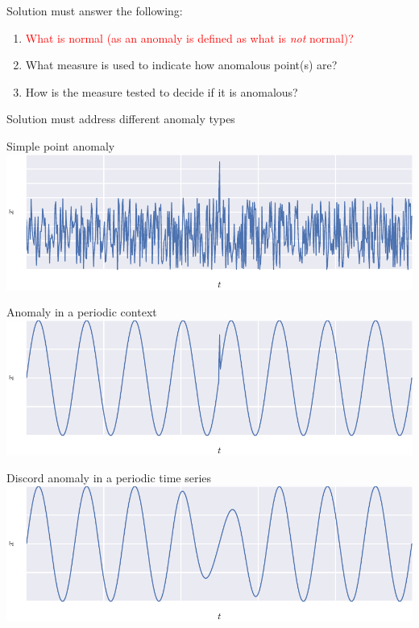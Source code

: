 \documentclass{beamer}
\begin{document}
  \begin{frame}{Solution must answer the following:}

    \begin{enumerate}
    \item
      \textcolor{red}{What is normal (as an anomaly is defined as what is \textit{not} normal)?}
    \item
      What measure is used to indicate how anomalous point(s) are?
    \item
      How is the measure tested to decide if it is anomalous?
    \end{enumerate}

  \end{frame}


  \begin{frame}[allowframebreaks]{Solution must address different anomaly types}

    Simple point anomaly
    \centering
    \includegraphics[width=\textwidth]{figs/trivial.pdf}

    \framebreak
    Anomaly in a periodic context
    \centering
    \includegraphics[width=\textwidth]{figs/context.pdf}

    \framebreak
    Discord anomaly in a periodic time series
    \centering
    \includegraphics[width=\textwidth]{figs/discord_per.pdf}


\end{frame}
\end{document}
